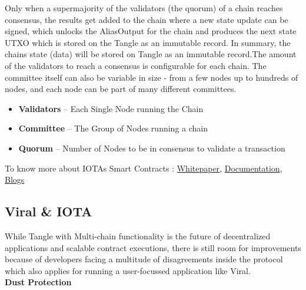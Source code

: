 \documentclass[10pt]{article}
\begin{document}
Only when a supermajority of the validators (the quorum) of a chain reaches consensus, the results get added to the chain where a new state update can be signed, which unlocks the AliasOutput for the chain and produces the next state UTXO which is stored on the Tangle as an immutable record. In summary, the chain\textsc{}s state (data) will be stored on Tangle as an immutable record.The amount of the validators to reach a consensus is configurable for each chain. The committee itself can also be variable in size - from a few nodes up to hundreds of nodes, and each node can be part of many different committees.

\begin{itemize}[leftmargin=+0.2in]
\item \textbf{Validators} – Each Single Node running the Chain
\item \textbf{Committee} – The Group of Nodes running a chain
\item \textbf{Quorum} – Number of Nodes to be in consensus to validate a transaction
\end{itemize}

To know more about IOTA\textsc{}s Smart Contracts : \hyperlink{https://files.iota.org/papers/ISC_WP_Nov_10_2021.pdf}{Whitepaper}, \hyperlink{https://wiki.iota.org/smart-contracts/overview}{Documentation}, \hyperlink{https://blog.iota.org/iota-smart-contracts-beta-release/}{Blogs}\\

\subsection{Viral \& IOTA}

While Tangle with Multi-chain functionality is the future of decentralized applications and scalable contract executions, there is still room for improvements because of developers facing a multitude of disagreements inside the protocol which also applies for running a user-focussed application like Viral. \\

\textbf{Dust Protection}\\
\end{document}
